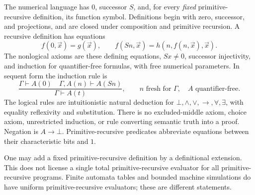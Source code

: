 The numerical language has $0$, successor $S$, and, for every \emph{fixed}
primitive-recursive definition, its function symbol. Definitions begin with
zero, successor, and projections, and are closed under composition and
primitive recursion. A recursive definition has equations
\[
 f(0,\vec x)=g(\vec x),\qquad
 f(Sn,\vec x)=h(n,f(n,\vec x),\vec x).
\]
The nonlogical axioms are these defining equations, $Sx\ne0$, successor
injectivity, and induction for quantifier-free formulas, with free numerical
parameters. In sequent form the induction rule is
\[
 \frac{\Gamma\vdash A(0)\quad
       \Gamma,A(n)\vdash A(Sn)}{\Gamma\vdash A(t)},
 \qquad n\text{ fresh for }\Gamma,\quad A\text{ quantifier-free}.
\]
The logical rules are intuitionistic natural deduction for
$\bot,\land,\lor,\to,\forall,\exists$, with equality reflexivity and
substitution. There is no excluded-middle axiom, choice axiom, unrestricted
induction, or rule converting semantic truth into a proof. Negation is
$A\to\bot$. Primitive-recursive predicates abbreviate equations between
their characteristic bits and $1$.

One may add a fixed primitive-recursive definition by a definitional
extension. This does not license a single total primitive-recursive evaluator
for all primitive-recursive programs. Finite automata tables and bounded
machine simulations do have uniform primitive-recursive evaluators; these
are different statements.

